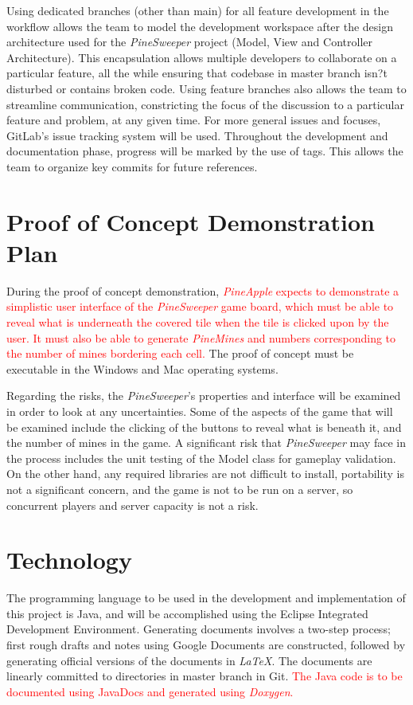 \documentclass{article}
\begin{document}
\vspace{5mm}
Using dedicated branches (other than main) for all feature development in the workflow allows the team to model the development
workspace after the design architecture used for the \textit{PineSweeper} project (Model, View and Controller Architecture). This
encapsulation allows multiple developers to collaborate on a particular feature, all the while ensuring that codebase in master branch isn?t
disturbed or contains broken code. Using feature branches also allows the team to streamline communication, constricting the focus of the
discussion to a particular feature and problem, at any given time. For more general issues and focuses, GitLab's issue tracking system will
be used. Throughout the development and documentation phase, progress will be marked by the use of tags. This allows the team to
organize key commits for future references. 

\section{Proof of Concept Demonstration Plan}
During the proof of concept demonstration, \textcolor{red}{\textit{PineApple} expects to demonstrate a simplistic user interface of the
\textit{PineSweeper} game board, which must be able to reveal what is underneath the covered tile when the tile is clicked upon by the
user. It must also be able to generate \textit{PineMines} and numbers corresponding to the number of mines bordering each cell.} The proof
of concept must be executable in the Windows and Mac operating systems.

\vspace{5mm}
Regarding the risks, the \textit{PineSweeper}'s properties and interface will be examined in order to look at any uncertainties. Some of the
aspects of the game that will be examined include the clicking of the buttons to reveal what is beneath it, and the number of mines in the
game. A significant risk that \textit{PineSweeper} may face in the process includes the unit testing of the Model class for gameplay
validation. On the other hand, any required libraries are not difficult to install, portability is not a significant concern, and the game is not
to be run on a server, so concurrent players and server capacity is not a risk.

\section{Technology}
The programming language to be used in the development and implementation of this project is Java, and will be accomplished using the
Eclipse Integrated Development Environment. Generating documents involves a two-step process; first rough drafts and notes using Google
Documents are constructed, followed by generating official versions of the documents in \textit{LaTeX}. The documents are linearly
committed to directories in master branch in Git. \textcolor{red}{The Java code is to be documented using JavaDocs and generated
using \textit{Doxygen}.}
\end{document}
